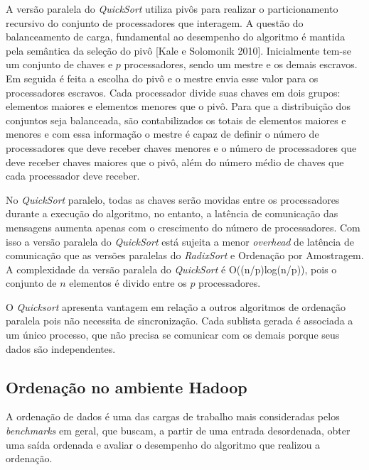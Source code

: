 A versão paralela do \textit{QuickSort} utiliza pivôs para realizar o particionamento recursivo do conjunto de processadores que interagem. A questão do balanceamento de carga, fundamental ao desempenho do algoritmo é mantida pela semântica da seleção do pivô [Kale e Solomonik 2010]. Inicialmente tem-se um conjunto de chaves e $p$ processadores, sendo um mestre e os demais escravos. Em seguida é feita a escolha do pivô e o mestre envia esse valor para os processadores escravos. Cada processador divide suas chaves em dois grupos: elementos maiores e elementos menores que o pivô. 
Para que  a distribuição dos conjuntos seja balanceada, são contabilizados os totais de elementos maiores e menores e com essa informação o mestre é capaz de definir o número de processadores que deve receber chaves menores e o número de processadores que deve receber chaves maiores que o pivô, além do número médio de chaves que cada processador deve receber. 

No \textit{QuickSort} paralelo, todas as chaves serão movidas entre os processadores durante a execução do algoritmo, no entanto, a latência de comunicação das mensagens aumenta apenas com o crescimento do número de processadores. Com isso a versão paralela do \textit{QuickSort} está sujeita a menor \textit{overhead} de latência de comunicação que as versões paralelas do \textit{RadixSort} e Ordenação por Amostragem. A complexidade da versão paralela do \textit{QuickSort} é O((n/p)log(n/p)), pois o conjunto de $n$ elementos é divido entre os $p$ processadores.  

 
O \textit{Quicksort} apresenta vantagem em relação a outros algoritmos de ordenação paralela pois 
não necessita de sincronização. Cada sublista gerada é associada a um único processo, que não precisa se comunicar com os demais porque seus dados são independentes. 


	
 \subsection{Ordenação no ambiente Hadoop}
\label{sec:benchmarks}
A ordenação de dados é uma das cargas de trabalho mais consideradas pelos \textit{benchmarks} em geral, que buscam, a partir de uma entrada desordenada, obter uma saída ordenada e avaliar o desempenho do algoritmo que realizou a ordenação.

